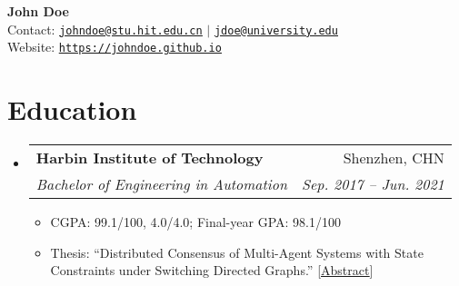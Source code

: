 \documentclass[a4paper,12pt]{article}
\makeatletter
\newcommand{\resumeItem}[1]{
  \item\small{
    {#1 \vspace{-2pt}}
  }
}
\newcommand{\resumeSubheading}[4]{
  \vspace{-2pt}\item
    \begin{tabular*}{0.97\textwidth}[t]{l@{\extracolsep{\fill}}r}
      \textbf{#1} & #2 \\
      \textit{\small#3} & \textit{\small #4} \\
    \end{tabular*}\vspace{-7pt}
}
\newcommand{\resumeSubHeadingListStart}{\begin{itemize}[leftmargin=0.15in, label={}]}
\newcommand{\resumeSubHeadingListEnd}{\end{itemize}}
\newcommand{\resumeItemListStart}{\begin{itemize}}
\newcommand{\resumeItemListEnd}{\end{itemize}\vspace{-5pt}}
\makeatother
\begin{document}

    \begin{center}
        \textbf{\Huge John Doe} \\ \vspace{5pt} 
        \normalsize{Contact: \href{mailto:johndoe@stu.hit.edu.cn}{\tt\underline{johndoe@stu.hit.edu.cn}} $|$ \href{mailto:jdoe@university.edu}{{\tt\underline{jdoe@university.edu}}} }\\ \vspace{3pt} 
        \normalsize{Website: \href{https://johndoe.github.io}{\underline{\tt{https://johndoe.github.io}}} }
    \end{center}



\section{Education}
  \resumeSubHeadingListStart
    \resumeSubheading
      {Harbin Institute of Technology}{Shenzhen, CHN}
      {Bachelor of Engineering in Automation}{Sep. 2017 -- Jun. 2021}
      \resumeItemListStart
        \resumeItem{CGPA: 99.1/100, 4.0/4.0; Final-year GPA: 98.1/100}
        \resumeItem{Thesis: ``Distributed Consensus of Multi-Agent Systems with  State Constraints under Switching Directed Graphs.''
            [\href{https://johndoe.github.io/files/abstr-Doe_Thesis.pdf}{\underline{Abstract}}]
        }
      \resumeItemListEnd
  \resumeSubHeadingListEnd

\end{document}
